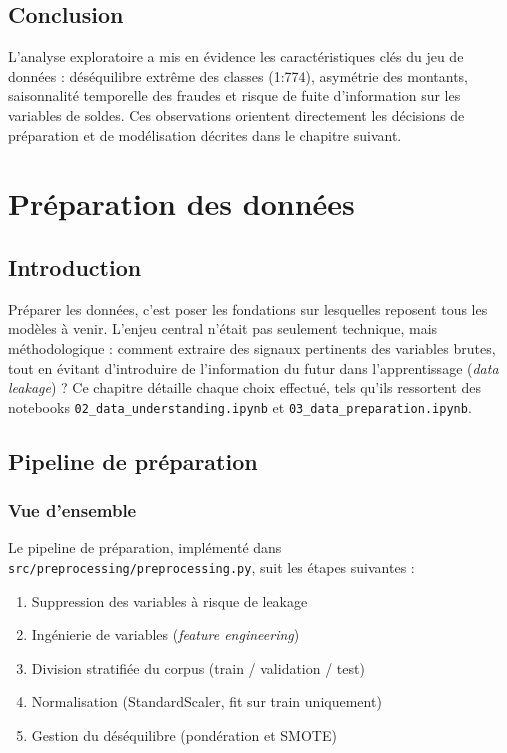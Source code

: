 \documentclass[12pt,a4paper,twoside]{report}
\begin{document}
\section*{Conclusion}

L'analyse exploratoire a mis en évidence les caractéristiques clés du jeu de données : déséquilibre extrême des classes (1:774), asymétrie des montants, saisonnalité temporelle des fraudes et risque de fuite d'information sur les variables de soldes. Ces observations orientent directement les décisions de préparation et de modélisation décrites dans le chapitre suivant.

\chapter{Préparation des données}

\section{Introduction}

Préparer les données, c'est poser les fondations sur lesquelles reposent tous les modèles à venir. L'enjeu central n'était pas seulement technique, mais méthodologique : comment extraire des signaux pertinents des variables brutes, tout en évitant d'introduire de l'information du futur dans l'apprentissage (\textit{data leakage}) ? Ce chapitre détaille chaque choix effectué, tels qu'ils ressortent des notebooks \texttt{02\_data\_understanding.ipynb} et \texttt{03\_data\_preparation.ipynb}.

\section{Pipeline de préparation}

\subsection{Vue d'ensemble}

Le pipeline de préparation, implémenté dans \texttt{src/preprocessing/preprocessing.py}, suit les étapes suivantes :

\begin{enumerate}
  \item Suppression des variables à risque de leakage
  \item Ingénierie de variables (\textit{feature engineering})
  \item Division stratifiée du corpus (train / validation / test)
  \item Normalisation (StandardScaler, fit sur train uniquement)
  \item Gestion du déséquilibre (pondération et SMOTE)
\end{enumerate}
\end{document}
